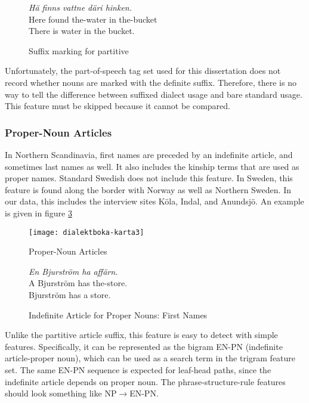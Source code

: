\begin{figure}
  {\it H\"a finns vattne d\"ari hinken.} \\
  Here found the-water in the-bucket \\
  There is water in the bucket. \\
  \caption{Suffix marking for partitive}
  \label{partitive-article}
\end{figure}

Unfortunately, the part-of-speech tag set used for this
dissertation does not record whether nouns are marked with the
definite suffix. Therefore, there is no way to tell the difference
between suffixed dialect usage and bare standard usage. This feature
must be skipped because it cannot be compared.

\subsubsection{Proper-Noun Articles}

In Northern Scandinavia, first names are preceded by an indefinite
article, and sometimes last names as well. It also includes the
kinship terms that are used as proper names. Standard Swedish does not
include this feature. In Sweden, this feature is found along the border
with Norway as well as Northern Sweden. In our data, this includes the
interview sites K\"ola, Indal, and Anundsj\"o. An example is given in
figure \ref{indefinite-article-proper-noun}

\begin{figure}
  \texttt{[image: dialektboka-karta3]}
  \caption{Proper-Noun Articles}
  \label{indefinite-article-proper-noun-map}
\end{figure}

\begin{figure}
  {\it En Bjurstr\"om ha aff\"arn.} \\
  A Bjurstr\"om has the-store. \\
  Bjurstr\"om has a store. \\
  \caption{Indefinite Article for Proper Nouns: First Names}
  \label{indefinite-article-proper-noun}
\end{figure}

Unlike the partitive article suffix, this feature is easy to detect
with simple features. Specifically, it can be represented as the
bigram EN-PN (indefinite article-proper noun), which can be used as a
search term in the trigram feature set. The same EN-PN sequence is
expected for leaf-head paths, since the indefinite article depends on
proper noun. The phrase-structure-rule features should
look something like NP$\to$EN-PN.

